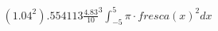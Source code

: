 \documentclass[preview]{standalone}
\begin{document}
\begin{align*}
\left(1.04^{2}\right).554113\frac{4.83}{10}^{3}\int_{-5}^{5}\pi\cdot fresca(x)^{2}dx
\end{align*}
\end{document}
